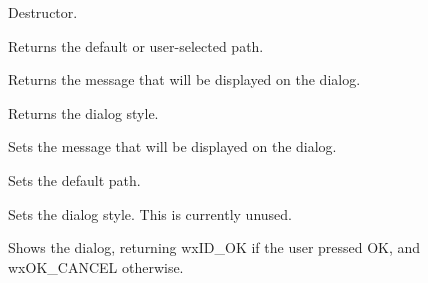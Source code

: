 



Destructor.

\label{wxdirdialoggetpath}


Returns the default or user-selected path.

\label{wxdirdialoggetmessage}


Returns the message that will be displayed on the dialog.

\label{wxdirdialoggetstyle}


Returns the dialog style.

\label{wxdirdialogsetmessage}


Sets the message that will be displayed on the dialog.

\label{wxdirdialogsetpath}


Sets the default path.

\label{wxdirdialogsetstyle}


Sets the dialog style. This is currently unused.

\label{wxdirdialogshowmodal}


Shows the dialog, returning wxID\_OK if the user pressed OK, and wxOK\_CANCEL
otherwise.


